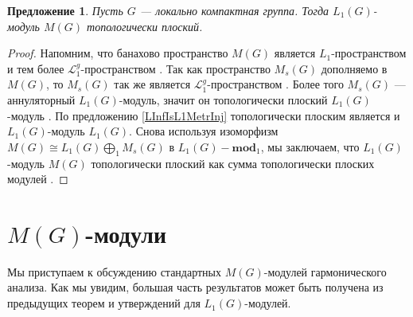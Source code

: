 \documentclass{article}
\numberwithin{equation}{section}
\theoremstyle{plain}
\newtheorem{propos}{Предложение}
\theoremstyle{definition}
\newtheorem{proof}{Доказательство}\def\theproof{}
\newcommand{\isom}{\mathop{\mathbin{\cong}}}
\begin{document}
\begin{fulltext}
\begin{propos}\label{MeasAlgIsL1TopFlat} Пусть $G$ --- локально компактная 
группа. Тогда $L_1(G)$-\\модуль $M(G)$ топологически плоский.
\end{propos}
\begin{proof} Напомним, что банахово пространство $M(G)$ является 
$L_1$-пространством и тем более $\mathscr{L}_1^g$-пространством 
\cite[пункт~3.13, упражнение~4.7(b)]{DefFloTensNorOpId}. Так как 
пространство $M_s(G)$ дополняемо в $M(G)$, то $M_s(G)$ так же является 
$\mathscr{L}_1^g$-пространством \cite[следствие~23.2.1(2)]{DefFloTensNorOpId}. 
Более того $M_s(G)$ --- аннуляторный $L_1(G)$-модуль, значит 
он топологически плоский $L_1(G)$-модуль 
\cite[предложение~3.6]{NemGeomProjInjFlatBanMod}. 
По предложению \ref{LInfIsL1MetrInj} топологически плоским является и 
$L_1(G)$-модуль $L_1(G)$. Снова используя изоморфизм 
$M(G)\isom L_1(G)\bigoplus_1 M_s(G)$ в $L_1(G)-\mathbf{mod}_1$, мы заключаем, 
что $L_1(G)$-модуль $M(G)$ топологически плоский как сумма 
топологически плоских модулей \cite[предложение~2.27]{NemGeomProjInjFlatBanMod}.
\end{proof}


\section{\texorpdfstring{$M(G)$}{M(G)}-модули}
\label{SubSectionMGModules}

Мы приступаем к обсуждению стандартных $M(G)$-модулей гармонического анализа. 
Как мы увидим, большая часть результатов может быть получена из предыдущих 
теорем и утверждений для $L_1(G)$-модулей.


\end{fulltext}
\end{document}

